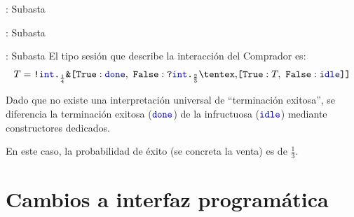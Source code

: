 \begin{frame}{\insertsection: Subasta}
	\AuctionBuyer[basicstyle=\footnotesize]
\end{frame}

\begin{frame}{\insertsection: Subasta}
	\Auctioneer[basicstyle=\footnotesize]
\end{frame}

\begin{frame}{\insertsection: Subasta}
	El tipo sesión que describe la interacción del Comprador es:
	\begin{equation*}
	    \label{eq:refined.auction}
	    \SessionType = \Out\tint{
		\BinaryPBranch[\frac{1}{4}]\Done{
		    \In\tint{
			\BinaryPChoice[\frac{2}{3}]\T\Idle
		    }
		}
	    }
	\end{equation*}

	Dado que no existe una interpretación universal de ``terminación
	exitosa'', se diferencia la terminación exitosa ($\Done$) de la
	infructuosa ($\Idle$) mediante constructores dedicados.

	\pause
	En este caso, la probabilidad de éxito (se concreta la venta) es de $\frac{1}{3}$.
\end{frame}

\section{Cambios a interfaz programática}

